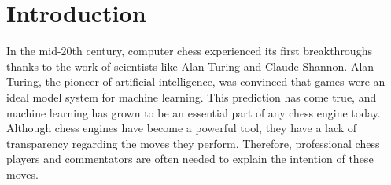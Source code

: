 \section{Introduction}

In the mid-20th century, computer chess experienced its first breakthroughs thanks to the work of scientists like Alan Turing and Claude Shannon. Alan Turing, the pioneer of artificial intelligence, was convinced that games were an ideal model system for machine learning. This prediction has come true, and machine learning has grown to be an essential part of any chess engine today. Although chess engines have become a powerful tool, they have a lack of transparency regarding the moves they perform. Therefore, professional chess players and commentators are often needed to explain the intention of these moves.